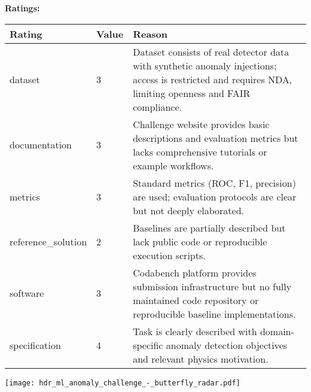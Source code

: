 {{{\bf Ratings:} ~ \\

\begin{tabular}{p{} p{} p{}}
\hline
Rating & Value & Reason \\
\hline
dataset & 3 & Dataset consists of real detector data with synthetic anomaly injections; access
is restricted and requires NDA, limiting openness and FAIR compliance.
 \\
documentation & 3 & Challenge website provides basic descriptions and evaluation metrics but lacks
comprehensive tutorials or example workflows.
 \\
metrics & 3 & Standard metrics (ROC, F1, precision) are used; evaluation protocols are clear
but not deeply elaborated.
 \\
reference\_solution & 2 & Baselines are partially described but lack public code or reproducible execution
scripts.
 \\
software & 3 & Codabench platform provides submission infrastructure but no fully maintained
code repository or reproducible baseline implementations.
 \\
specification & 4 & Task is clearly described with domain-specific anomaly detection objectives and
relevant physics motivation.
 \\
\hline
\end{tabular}

\texttt{[image: hdr\_ml\_anomaly\_challenge\_-\_butterfly\_radar.pdf]}
}}
\clearpage